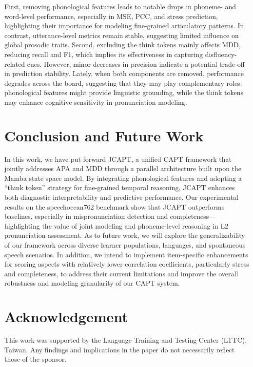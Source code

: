 \documentclass{Interspeech}
\begin{document}
First, removing phonological features leads to notable drops in phoneme- and word-level performance, especially in MSE, PCC, and stress prediction, highlighting their importance for modeling fine-grained articulatory patterns. In contrast, utterance-level metrics remain stable, suggesting limited influence on global prosodic traits. Second, excluding the think tokens mainly affects MDD, reducing recall and F1, which implies its effectiveness in capturing disfluency-related cues. However, minor decreases in precision indicate a potential trade-off in prediction stability. 
Lately, when both components are removed, performance degrades across the board, suggesting that they may play complementary roles: phonological features might provide linguistic grounding, while the think tokens may enhance cognitive sensitivity in pronunciation modeling.


\section{Conclusion and Future Work}
In this work, we have put forward JCAPT, a unified CAPT framework that jointly addresses APA and MDD through a parallel architecture built upon the Mamba state space model. By integrating phonological features and adopting a “think token” strategy for fine-grained temporal reasoning, JCAPT enhances both diagnostic interpretability and predictive performance. Our experimental results on the speechocean762 benchmark show that JCAPT outperforms baselines, especially in mispronunciation detection and completeness—highlighting the value of joint modeling and phoneme-level reasoning in L2 pronunciation assessment. As to future work, we will explore the generalizability of our framework across diverse learner populations, languages, and spontaneous speech scenarios. In addition, we intend to implement item-specific enhancements for scoring aspects with relatively lower correlation coefficients, particularly stress and completeness, to address their current limitations and improve the overall robustness and modeling granularity of our CAPT system.


\section{Acknowledgement}
This work was supported by the Language Training and Testing Center (LTTC), Taiwan. Any findings and implications in the paper do not necessarily reflect those of the sponsor.



\end{document}
